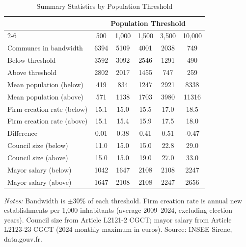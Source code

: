 \begin{table}[t]
\centering
\caption{Summary Statistics by Population Threshold}
\label{tab:summary}
\begin{tabular}{lccccc}
\hline\hline
 & \multicolumn{5}{c}{Population Threshold} \\
\cmidrule(lr){2-6}
 & 500 & 1,000 & 1,500 & 3,500 & 10,000 \\
\hline
Communes in bandwidth & 6394 & 5109 & 4001 & 2038 & 749 \\
\quad Below threshold & 3592 & 3092 & 2546 & 1291 & 490 \\
\quad Above threshold & 2802 & 2017 & 1455 & 747 & 259 \\
Mean population (below) & 419 & 834 & 1247 & 2921 & 8338 \\
Mean population (above) & 571 & 1138 & 1703 & 3980 & 11316 \\
\hline
Firm creation rate (below) & 15.1 & 15.0 & 15.5 & 17.0 & 18.5 \\
Firm creation rate (above) & 15.1 & 15.4 & 15.9 & 17.5 & 18.0 \\
Difference & 0.01 & 0.38 & 0.41 & 0.51 & -0.47 \\
\hline
Council size (below) & 11.0 & 15.0 & 15.0 & 22.8 & 29.0 \\
Council size (above) & 15.0 & 15.0 & 19.0 & 27.0 & 33.0 \\
Mayor salary (below) & 1042 & 1647 & 2108 & 2108 & 2247 \\
Mayor salary (above) & 1647 & 2108 & 2108 & 2247 & 2656 \\
\hline\hline
\end{tabular}
\begin{tablenotes}\small
\item \textit{Notes:} Bandwidth is $\pm$30\% of each threshold. Firm creation rate is annual new establishments per 1,000 inhabitants (average 2009--2024, excluding election years). Council size from Article L2121-2 CGCT; mayor salary from Article L2123-23 CGCT (2024 monthly maximum in euros). Source: INSEE Sirene, data.gouv.fr.
\end{tablenotes}
\end{table}

